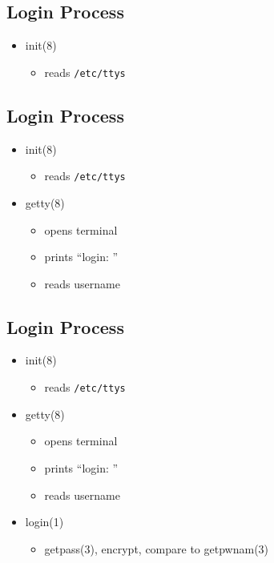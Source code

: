 \documentclass[xga]{xdvislides}
\begin{document}
\subsection{Login Process}
\begin{itemize}
	\item init(8)
		\begin{itemize}
			\item reads {\tt /etc/ttys}
		\end{itemize}
\end{itemize}

\subsection{Login Process}
\begin{itemize}
	\item init(8)
		\begin{itemize}
			\item reads {\tt /etc/ttys}
		\end{itemize}
	\item getty(8)
		\begin{itemize}
			\item opens terminal
			\item prints ``login: ''
			\item reads username
		\end{itemize}
\end{itemize}

\subsection{Login Process}
\begin{itemize}
	\item init(8)
		\begin{itemize}
			\item reads {\tt /etc/ttys}
		\end{itemize}
	\item getty(8)
		\begin{itemize}
			\item opens terminal
			\item prints ``login: ''
			\item reads username
		\end{itemize}
	\item login(1)
		\begin{itemize}
			\item getpass(3), encrypt, compare to getpwnam(3)
		\end{itemize}
\end{itemize}
\end{document}
